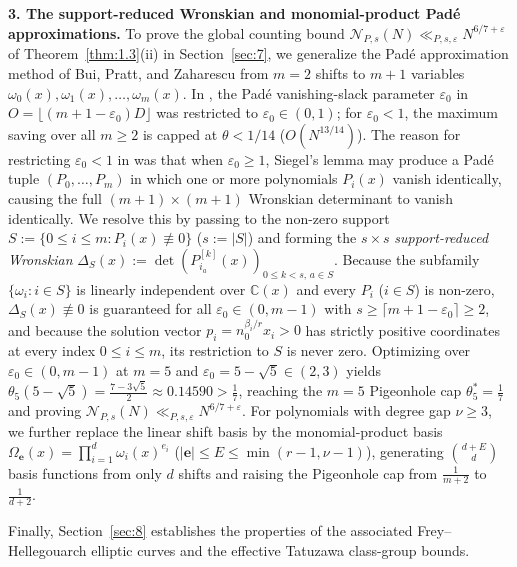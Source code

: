 \documentclass[11pt,reqno]{amsart}
\theoremstyle{remark}
\numberwithin{equation}{section}
\newcommand{\C}{\mathbb{C}}
\begin{document}
\medskip
\noindent\textbf{3. The support-reduced Wronskian and monomial-product Pad\'e approximations.}
To prove the global counting bound $\mathcal{N}_{P,s}(N) \ll_{P,s,\varepsilon} N^{6/7+\varepsilon}$ of Theorem~\ref{thm:1.3}(ii) in Section~\ref{sec:7}, we generalize the Pad\'e approximation method of Bui, Pratt, and Zaharescu \cite{BuiPrattZaharescu2023} from $m = 2$ shifts to $m + 1$ variables $\omega_0(x), \omega_1(x), \dots, \omega_m(x)$. In \cite{BuiPrattZaharescu2023}, the Pad\'e vanishing-slack parameter $\varepsilon_0$ in $O = \lfloor (m + 1 - \varepsilon_0)D \rfloor$ was restricted to $\varepsilon_0 \in (0, 1)$; for $\varepsilon_0 < 1$, the maximum saving over all $m \ge 2$ is capped at $\theta < 1/14$ ($O(N^{13/14})$). The reason for restricting $\varepsilon_0 < 1$ in \cite{BuiPrattZaharescu2023} was that when $\varepsilon_0 \ge 1$, Siegel's lemma may produce a Pad\'e tuple $(P_0, \dots, P_m)$ in which one or more polynomials $P_i(x)$ vanish identically, causing the full $(m + 1) \times (m + 1)$ Wronskian determinant to vanish identically. We resolve this by passing to the non-zero support $S := \{0 \le i \le m : P_i(x) \not\equiv 0\}$ ($s := |S|$) and forming the $s \times s$ \emph{support-reduced Wronskian} $\Delta_S(x) := \det(P_{i_a}^{[k]}(x))_{0 \le k < s,\, a \in S}$. Because the subfamily $\{\omega_i : i \in S\}$ is linearly independent over $\C(x)$ and every $P_i$ ($i \in S$) is non-zero, $\Delta_S(x) \not\equiv 0$ is guaranteed for all $\varepsilon_0 \in (0, m - 1)$ with $s \ge \lceil m + 1 - \varepsilon_0 \rceil \ge 2$, and because the solution vector $p_i = n_0^{\beta_i/r} x_i > 0$ has strictly positive coordinates at every index $0 \le i \le m$, its restriction to $S$ is never zero. Optimizing over $\varepsilon_0 \in (0, m - 1)$ at $m = 5$ and $\varepsilon_0 = 5 - \sqrt{5} \in (2, 3)$ yields $\theta_5(5 - \sqrt{5}) = \frac{7 - 3\sqrt{5}}{2} \approx 0.14590 > \frac{1}{7}$, reaching the $m = 5$ Pigeonhole cap $\theta_5^* = \frac{1}{7}$ and proving $\mathcal{N}_{P,s}(N) \ll_{P,s,\varepsilon} N^{6/7+\varepsilon}$. For polynomials with degree gap $\nu \ge 3$, we further replace the linear shift basis by the monomial-product basis $\Omega_{\mathbf{e}}(x) = \prod_{i=1}^d \omega_i(x)^{e_i}$ ($|\mathbf{e}| \le E \le \min(r - 1, \nu - 1)$), generating $\binom{d+E}{d}$ basis functions from only $d$ shifts and raising the Pigeonhole cap from $\frac{1}{m+2}$ to $\frac{1}{d+2}$.

Finally, Section~\ref{sec:8} establishes the properties of the associated Frey--Hellegouarch elliptic curves and the effective Tatuzawa class-group bounds.
\end{document}
